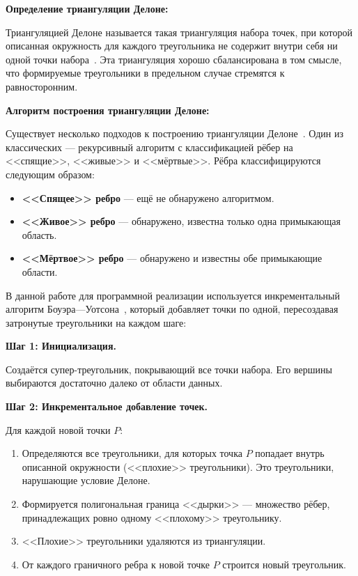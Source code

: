 \documentclass[a4paper, 14pt]{extarticle}
\begin{document}
\textbf{Определение триангуляции Делоне:}

Триангуляцией Делоне называется такая триангуляция набора точек, при которой описанная окружность для каждого треугольника не содержит внутри себя ни одной точки набора~\cite{skvortsov2002}. Эта триангуляция хорошо сбалансирована в том смысле, что формируемые треугольники в предельном случае стремятся к равносторонним.

\textbf{Алгоритм построения триангуляции Делоне:}

Существует несколько подходов к построению триангуляции Делоне~\cite{deberg2004}. Один из классических --- рекурсивный алгоритм с классификацией рёбер на <<спящие>>, <<живые>> и <<мёртвые>>. Рёбра классифицируются следующим образом:
\begin{itemize}
  \item \textbf{<<Спящее>> ребро} --- ещё не обнаружено алгоритмом.
  \item \textbf{<<Живое>> ребро} --- обнаружено, известна только одна примыкающая область.
  \item \textbf{<<Мёртвое>> ребро} --- обнаружено и известны обе примыкающие области.
\end{itemize}

В данной работе для программной реализации используется инкрементальный алгоритм Боуэра---Уотсона~\cite{skvortsov2002}, который добавляет точки по одной, пересоздавая затронутые треугольники на каждом шаге:

\textbf{Шаг 1: Инициализация.}

Создаётся супер-треугольник, покрывающий все точки набора. Его вершины выбираются достаточно далеко от области данных.

\textbf{Шаг 2: Инкрементальное добавление точек.}

Для каждой новой точки $P$:
\begin{enumerate}
  \item Определяются все треугольники, для которых точка $P$ попадает внутрь описанной окружности (<<плохие>> треугольники). Это треугольники, нарушающие условие Делоне.
  \item Формируется полигональная граница <<дырки>> --- множество рёбер, принадлежащих ровно одному <<плохому>> треугольнику.
  \item <<Плохие>> треугольники удаляются из триангуляции.
  \item От каждого граничного ребра к новой точке $P$ строится новый треугольник.
\end{enumerate}
\end{document}

